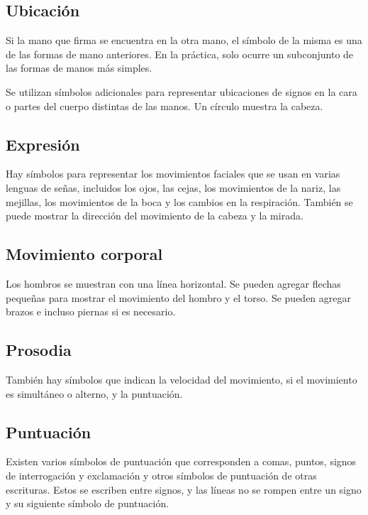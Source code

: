 \subsection{Ubicación}\label{subsection:state-of-the-art:sl:location}

Si la mano que firma se encuentra en la otra mano, el símbolo de la misma es una de las formas de mano anteriores. En la práctica, solo ocurre un subconjunto de las formas de manos más simples.

Se utilizan símbolos adicionales para representar ubicaciones de signos en la cara o partes del cuerpo distintas de las manos. Un círculo muestra la cabeza.

\subsection{Expresión}\label{subsection:state-of-the-art:sl:expression}
Hay símbolos para representar los movimientos faciales que se usan en varias lenguas de señas, incluidos los ojos, las cejas, los movimientos de la nariz, las mejillas, los movimientos de la boca y los cambios en la respiración. También se puede mostrar la dirección del movimiento de la cabeza y la mirada.

\subsection{Movimiento corporal}\label{subsection:state-of-the-art:sl:body_movement}
Los hombros se muestran con una línea horizontal. Se pueden agregar flechas pequeñas para mostrar el movimiento del hombro y el torso. Se pueden agregar brazos e incluso piernas si es necesario.

\subsection{Prosodia}\label{subsection:state-of-the-art:sl:prosody}

También hay símbolos que indican la velocidad del movimiento, si el movimiento es simultáneo o alterno, y la puntuación.

\subsection{Puntuación}\label{subsection:state-of-the-art:sl:punctuation}
Existen varios símbolos de puntuación que corresponden a comas, puntos, signos de interrogación y exclamación y otros símbolos de puntuación de otras escrituras. Estos se escriben entre signos, y las líneas no se rompen entre un signo y su siguiente símbolo de puntuación.




